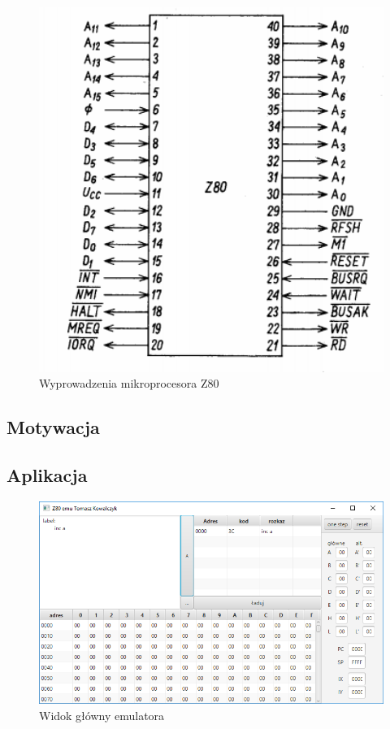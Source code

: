 \documentclass{article}
\begin{document}
	
	\begin{figure}[h]
		\centering
		\includegraphics[width=1.0\textwidth]{z80wyprowadzenia}
		\caption{Wyprowadzenia mikroprocesora Z80}
		\label{img:z80wyprowadzenia}
	\end{figure}
	
	\subsection{Motywacja}
	
	\subsection{Aplikacja}
		
	\begin{figure}[h]		
		\centering
		\includegraphics[width=1.0\textwidth]{app1}
		\caption{Widok główny emulatora}
	\end{figure}
	
\end{document}
